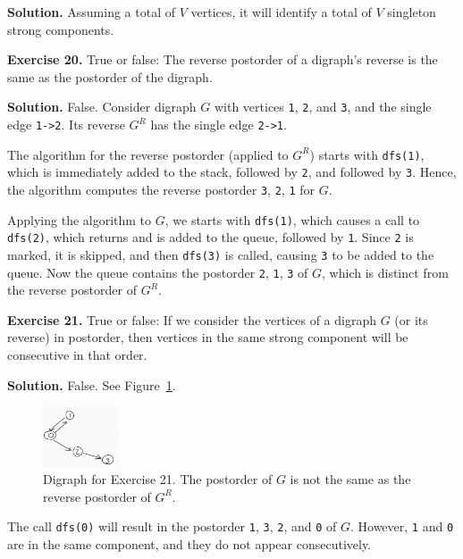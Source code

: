 \documentclass[12pt, a4paper]{article}
\newenvironment{ex}[2][Exercise]
{\par\medskip\noindent \textbf{#1 #2.}}
{\medskip}
\newenvironment{sol}[1][Solution]
{\par\medskip\noindent \textbf{#1.} }
{\medskip}
\begin{document}
	\begin{sol}
		Assuming a total of $V$ vertices, it will identify a total of $V$ singleton strong
		components. 
	\end{sol}
	\begin{ex}{20}
		True or false: The reverse postorder of a digraph's reverse is the same as the
		postorder of the digraph.
	\end{ex}
	\begin{sol}
		False. Consider digraph $G$ with vertices \texttt{1}, \texttt{2}, and \texttt{3},
		and the single edge \texttt{1->2}. Its reverse $G^R$ has the single edge
		\texttt{2->1}.
		
		The algorithm for the reverse postorder (applied to $G^R$) starts with \texttt{dfs(1)},
		which is immediately added to the stack, followed by \texttt{2}, and followed by
		\texttt{3}. Hence, the algorithm computes the reverse postorder \texttt{3},
		\texttt{2}, \texttt{1} for $G$.
		
		Applying the algorithm to $G$, we starts with \texttt{dfs(1)}, which causes
		a call to \texttt{dfs(2)}, which returns and is added to the queue, followed by
		\texttt{1}. Since \texttt{2} is marked, it is skipped, and then \texttt{dfs(3)}
		is called, causing \texttt{3} to be added to the queue. Now the queue contains
		the postorder \texttt{2}, \texttt{1}, \texttt{3} of $G$, which is distinct from
		the reverse postorder of $G^R$.
	\end{sol}
	\begin{ex}{21}
		True or false: If we consider the vertices of a digraph $G$ (or its reverse)
		in postorder, then vertices in the same strong component will be consecutive in
		that order.
	\end{ex}
	\begin{sol}
		False. See Figure~\ref{fig:ex-21}.
		\begin{figure}
			\centering
			\includegraphics[width=0.2\textwidth]{exercise-21}
			\caption{Digraph for Exercise 21. The postorder of $G$ is not
			the same as the reverse postorder of $G^R$.}
			\label{fig:ex-21}
		\end{figure}
		The call \texttt{dfs(0)} will result in the postorder \texttt{1}, \texttt{3},
		\texttt{2}, and \texttt{0} of $G$. However, \texttt{1} and \texttt{0} are in
		the same component, and they do not appear consecutively.
	\end{sol}
\end{document}
